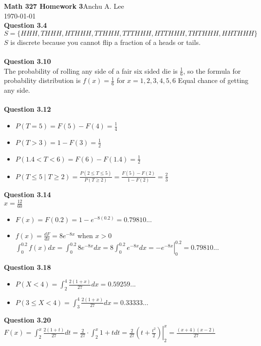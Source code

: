 \documentclass{article}
\begin{document}
    \noindent\textbf{Math 327 Homework 3}\hfill Anchu A. Lee\\
    \noindent\today\\
    
    \noindent\textbf{Question 3.4}\\
    $S=\{HHH, THHH, HTHHH, TTHHH, TTTHHH, HTTHHH, THTHHH, HHTHHH\}$\\
    $S$ is discrete because you cannot flip a fraction of a heads or tails.\\\\
    \textbf{Question 3.10}\\
    The probability of rolling any side of a fair six sided die is $\frac{1}{6}$, 
    so the formula for probability distribution is $f(x)=\frac{1}{6}$ for
    $x=1,2,3,4,5,6$ Equal chance of getting any side.\\\\
    \textbf{Question 3.12}
    \begin{itemize}
        \item $P(T=5) = F(5)-F(4) = \frac{1}{4}$
        \item $P(T>3) = 1-F(3) = \frac{1}{2}$
        \item $P(1.4 < T < 6) = F(6)-F(1.4)=\frac{1}{2}$
        \item $P(T\leq 5 \mid T\geq 2) = \frac{P(2\leq T\leq 5)}{P(T\geq 2)} = \frac{F(5)-F(2)}{1-F(2)} = \frac{2}{3}$
    \end{itemize}
    \textbf{Question 3.14}\\
    $x = \frac{12}{60}$
    \begin{itemize}
        \item $F(x) = F(0.2) = 1-e^{-8(0.2)} = 0.79810...$
        \item $f(x) = \frac{dF}{dx} = 8e^{-8x}$ when $x > 0$\\
              $\left.\int_{0}^{0.2}f(x)dx = \int_{0}^{0.2}8e^{-8x}dx = 8\int_{0}^{0.2}e^{-8x}dx = {-e^{-8x}}\right\vert_{0}^{0.2} = 0.79810...$
    \end{itemize}
    \textbf{Question 3.18}
    \begin{itemize}
        \item $P(X<4) = \int_{2}^{4}\frac{2(1+x)}{27}dx=0.59259...$
        \item $P(3\leq X < 4) = \int_{3}^{4}\frac{2(1+x)}{27}dx=0.33333...$
    \end{itemize}
    \textbf{Question 3.20}\\
    $F(x)=\int_{2}^{x}\frac{2(1+t)}{27}dt=\frac{2}{27}\cdot \int_{2}^{x}1+tdt =\frac{2}{27}\left.(t+\frac{t^2}{2})\right\vert_2^x = \frac{(x+4)(x-2)}{27}$\\
\end{document}
